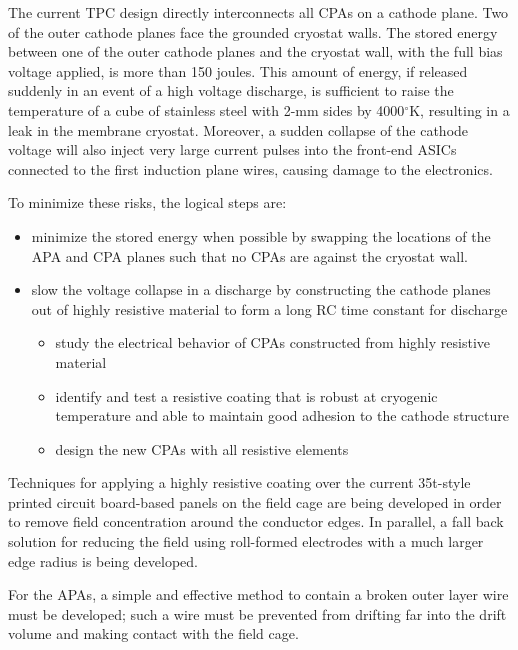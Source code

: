 The current TPC design directly interconnects all CPAs on a cathode plane. Two of the outer cathode planes face the grounded cryostat walls. The stored energy between one of the outer cathode planes and the cryostat wall, with the full bias voltage applied, is more than 150 joules\cite{ve-fd_025_8920}. This amount of energy, if released suddenly in an event of a high voltage discharge, is sufficient to raise the temperature of a cube of stainless steel with 2-mm sides by 4000$^\circ$K, resulting in a leak in the membrane cryostat. Moreover, a sudden collapse of the cathode voltage will also inject very large current pulses into the front-end ASICs connected to the first induction plane wires, causing damage to the electronics.
 
To minimize these risks, the logical steps are:
\begin{itemize}
\item minimize the stored energy when possible by swapping the locations of the APA and CPA planes such that no CPAs are against the cryostat wall.
\item slow the voltage collapse in a discharge by constructing the cathode planes out of highly resistive material to form a long RC time constant for discharge
\begin{itemize}
\item study the electrical behavior of CPAs constructed from highly resistive material
\item identify and test a resistive coating that is robust at cryogenic temperature and able to maintain good adhesion to the cathode structure
\item design the new CPAs with all resistive elements
\end{itemize}
\end{itemize}
 
Techniques for applying a highly resistive coating over the current 35t-style printed circuit board-based panels on the field cage are being developed in order to remove field concentration around the conductor edges.
In parallel, a fall back solution for reducing the field using roll-formed electrodes with a much larger edge radius is being developed.
 
For the APAs, a simple and effective method to contain a broken outer layer wire must be developed; such a wire must be prevented from drifting far into the drift volume and making contact with the field cage.
 

